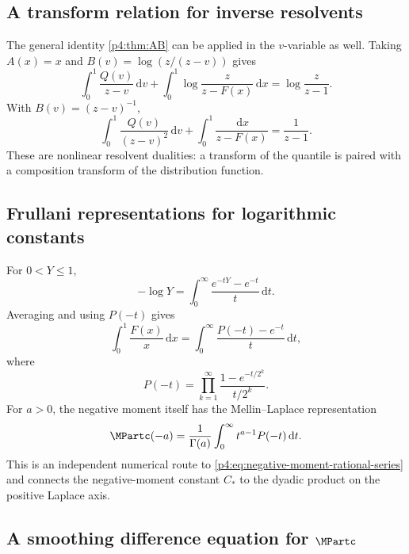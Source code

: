 \documentclass[11pt,oneside]{article}
\theoremstyle{definition}
\theoremstyle{remark}
\newcommand{\F}{F}
\newcommand{\Q}{Q}
\newcommand{\dd}{\,\mathrm d}
\newcommand{\1}{\mathbf 1}
\begin{document}
\subsection{A transform relation for inverse resolvents}

The general identity \cref{p4:thm:AB} can be applied in the \(v\)-variable as well.  Taking
\(A(x)=x\) and
\(B(v)=\log(z/(z-v))\) gives
\begin{equation}\label{p4:eq:inverse-log-resolvent}
 \int_0^1\frac{\Q(v)}{z-v}\dd v
 +\int_0^1\log\frac{z}{z-\F(x)}\dd x
 =\log\frac{z}{z-1}.
\end{equation}
With \(B(v)=(z-v)^{-1}\),
\begin{equation}\label{p4:eq:inverse-square-resolvent}
 \int_0^1\frac{\Q(v)}{(z-v)^2}\dd v
 +\int_0^1\frac{\dd x}{z-\F(x)}
 =\frac1{z-1}.
\end{equation}
These are nonlinear resolvent dualities: a transform of the quantile is paired with a
composition transform of the distribution function.

\subsection{Frullani representations for logarithmic constants}

For \(0<Y\le1\),
\begin{equation}\label{p4:eq:Frullani-log}
 -\log Y=\int_0^\infty\frac{e^{-tY}-e^{-t}}t\dd t.
\end{equation}
Averaging and using \(P(-t)\) gives
\begin{equation}\label{p4:eq:log-Frullani-product}
 \int_0^1\frac{\F(x)}x\dd x
 =\int_0^\infty\frac{P(-t)-e^{-t}}t\dd t,
\end{equation}
where
\begin{equation}\label{p4:eq:Pminus-product}
 P(-t)=\prod_{k=1}^{\infty}
 \frac{1-e^{-t/2^k}}{t/2^k}.
\end{equation}
For \(a>0\), the negative moment itself has the Mellin--Laplace representation
\begin{equation}\label{p4:eq:negative-Mellin-Laplace}
 \MPartc(-a)=\frac1{\Gamma(a)}\int_0^\infty t^{a-1}P(-t)\dd t.
\end{equation}
This is an independent numerical route to \cref{p4:eq:negative-moment-rational-series} and
connects the negative-moment constant \(C_*\) to the dyadic product on the positive
Laplace axis.

\subsection{A smoothing difference equation for \texorpdfstring{\(\MPartc\)}{M}}
\end{document}
